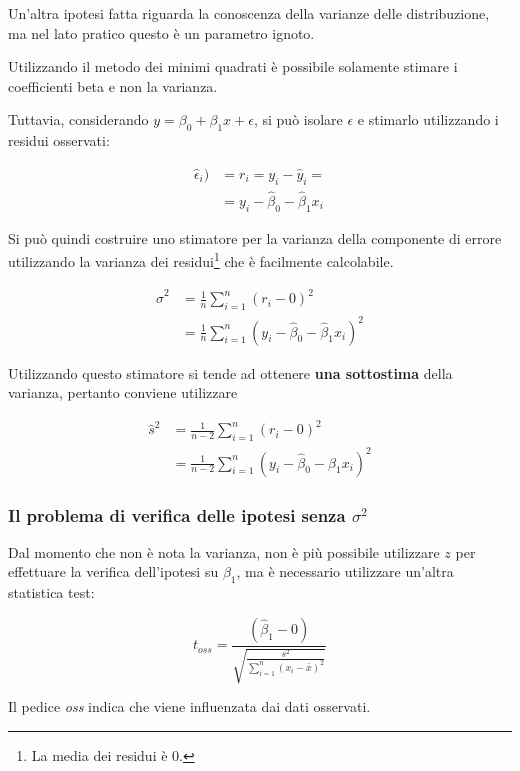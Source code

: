 Un'altra ipotesi fatta riguarda la conoscenza della varianze delle
distribuzione, ma nel lato pratico questo è un parametro ignoto.

Utilizzando il metodo dei minimi quadrati è possibile solamente stimare
i coefficienti beta e non la varianza.

Tuttavia, considerando $y = \beta_0 + \beta_1x + \epsilon$, si può
isolare $\epsilon$ e stimarlo utilizzando i residui osservati:

\begin{align*}
	\hat{\epsilon}_i ) &= r_i = y_i - \hat{y}_i = \\
								  &= y_i - \hat{\beta}_0 - \hat{\beta}_1x_i
\end{align*}


Si può quindi costruire uno stimatore per la varianza della componente di
errore utilizzando la varianza dei residui\footnote{La media dei residui è 0.} che è facilmente calcolabile.

\begin{align*} 
	\hat{\sigma}^2 &= \frac{1}{n}\sum\limits_{i=1}^n (r_{i} - 0)^2\\
								&= \frac{1}{n}\sum\limits_{i=1}^n (y_i - \hat{\beta}_0 - \hat{\beta}_1x_i)^2
\end{align*}

Utilizzando questo stimatore si tende ad ottenere \textbf{una sottostima} della varianza, pertanto conviene utilizzare

\begin{align*} 
\hat{s}^2 &= \frac{1}{n-2}\sum\limits_{i=1}^n (r_{i} - 0)^2\\
				 &= \frac{1}{n-2}\sum\limits_{i=1}^n (y_i - \hat{\beta}_0 - \hat{\beta}_1x_i)^2
\end{align*}

\subsubsection{Il problema di verifica delle ipotesi senza $\sigma^2$}\label{il-problema-di-verifica-delle-ipotesi-senza-sigma2}

Dal momento che non è nota la varianza, non è più possibile utilizzare $ z $ per effettuare la verifica dell'ipotesi su $ \beta_1 $, ma è necessario utilizzare un'altra statistica test:

$$
t_{oss} = \frac{(\hat{\beta}_1 - 0)}{\sqrt{\frac{s^2}{\sum_{i=1}^{n} (x_i - \bar{x})^2}}}
$$

Il pedice \textit{oss} indica che viene influenzata dai dati osservati.

